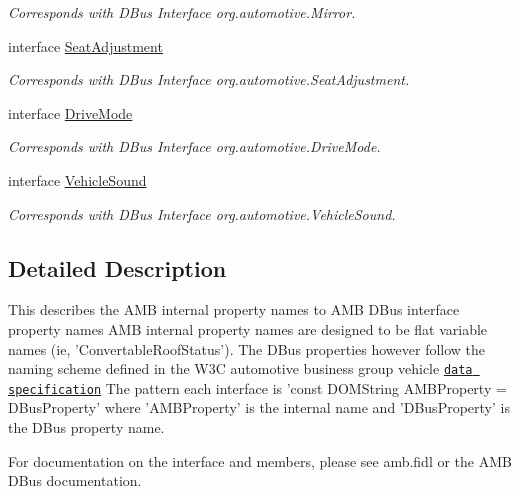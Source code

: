 \begin{DoxyCompactItemize}
\begin{DoxyCompactList}\small\item\em Corresponds with D\+Bus Interface org.\+automotive.\+Mirror. \end{DoxyCompactList}\item 
interface \hyperlink{interfaceSeatAdjustment}{Seat\+Adjustment}
\begin{DoxyCompactList}\small\item\em Corresponds with D\+Bus Interface org.\+automotive.\+Seat\+Adjustment. \end{DoxyCompactList}\item 
interface \hyperlink{interfaceDriveMode}{Drive\+Mode}
\begin{DoxyCompactList}\small\item\em Corresponds with D\+Bus Interface org.\+automotive.\+Drive\+Mode. \end{DoxyCompactList}\item 
interface \hyperlink{interfaceVehicleSound}{Vehicle\+Sound}
\begin{DoxyCompactList}\small\item\em Corresponds with D\+Bus Interface org.\+automotive.\+Vehicle\+Sound. \end{DoxyCompactList}\end{DoxyCompactItemize}


\subsection{Detailed Description}
This describes the A\+M\+B internal property names to A\+M\+B D\+Bus interface property names A\+M\+B internal property names are designed to be flat variable names (ie, 'Convertable\+Roof\+Status'). The D\+Bus properties however follow the naming scheme defined in the W3\+C automotive business group vehicle \href{http://w3c.github.io/automotive-bg/data_spec.html}{\tt data specification} The pattern each interface is 'const D\+O\+M\+String A\+M\+B\+Property = D\+Bus\+Property' where 'A\+M\+B\+Property' is the internal name and 'D\+Bus\+Property' is the D\+Bus property name. 

For documentation on the interface and members, please see amb.\+fidl or the A\+M\+B D\+Bus documentation. 
